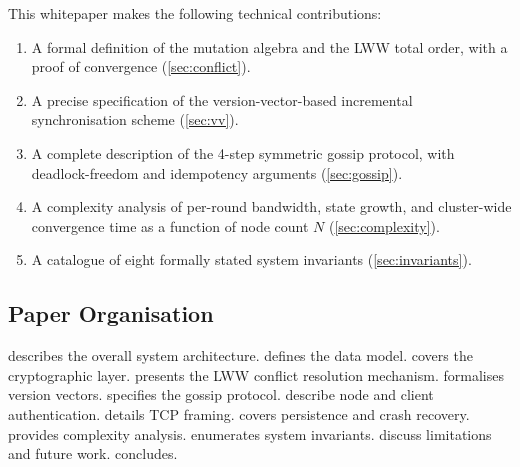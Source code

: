 This whitepaper makes the following technical contributions:

\begin{enumerate}[leftmargin=1.5em]
  \item A formal definition of the mutation algebra and the LWW total order, with
        a proof of convergence (\cref{sec:conflict}).
  \item A precise specification of the version-vector-based incremental
        synchronisation scheme (\cref{sec:vv}).
  \item A complete description of the 4-step symmetric gossip protocol, with
        deadlock-freedom and idempotency arguments (\cref{sec:gossip}).
  \item A complexity analysis of per-round bandwidth, state growth, and
        cluster-wide convergence time as a function of node count $N$
        (\cref{sec:complexity}).
  \item A catalogue of eight formally stated system invariants (\cref{sec:invariants}).
\end{enumerate}

\subsection{Paper Organisation}

 describes the overall system architecture.
 defines the data model.
 covers the cryptographic layer.
 presents the LWW conflict resolution mechanism.
 formalises version vectors.
 specifies the gossip protocol.
 describe node and client authentication.
 details TCP framing.
 covers persistence and crash recovery.
 provides complexity analysis.
 enumerates system invariants.
 discuss limitations and future work.
 concludes.
